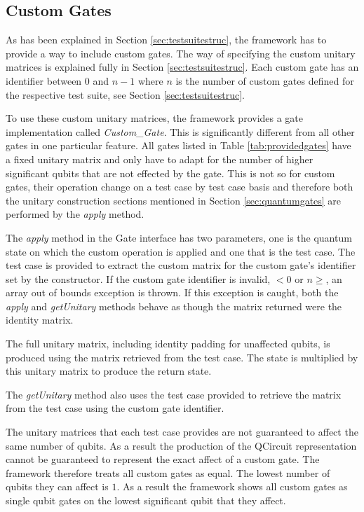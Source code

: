 \subsection{Custom Gates}
\label{sec:custgates}

As has been explained in Section \ref{sec:testsuitestruc}, the framework has to provide a way to include custom gates.
The way of specifying the custom unitary matrices is explained fully in Section \ref{sec:testsuitestruc}.
Each custom gate has an identifier between $0$ and $n-1$ where $n$ is the number of custom gates defined for the respective test suite, see Section \ref{sec:testsuitestruc}.

To use these custom unitary matrices, the framework provides a gate implementation called \emph{Custom\_Gate}.
This is significantly different from all other gates in one particular feature.
All gates listed in Table \ref{tab:providedgates} have a fixed unitary matrix and only have to adapt for the number of higher significant qubits that are not effected by the gate.
This is not so for custom gates, their operation change on a test case by test case basis and therefore both the unitary construction sections mentioned in Section \ref{sec:quantumgates} are performed by the \emph{apply} method.

The \emph{apply} method in the Gate interface has two parameters, one is the quantum state on which the custom operation is applied and one that is the test case.
The test case is provided to extract the custom matrix for the custom gate's identifier set by the constructor.
If the custom gate identifier is invalid, $<0$ or $n\geq$, an array out of bounds exception is thrown.
If this exception is caught, both the \emph{apply} and \emph{getUnitary} methods behave as though the matrix returned were the identity matrix.

The full unitary matrix, including identity padding for unaffected qubits, is produced using the matrix retrieved from the test case.
The state is multiplied by this unitary matrix to produce the return state.

The \emph{getUnitary} method also uses the test case provided to retrieve the matrix from the test case using the custom gate identifier.

The unitary matrices that each test case provides are not guaranteed to affect the same number of qubits.
As a result the production of the QCircuit\cite{QCsite} representation cannot be guaranteed to represent the exact affect of a custom gate.
The framework therefore treats all custom gates as equal.
The lowest number of qubits they can affect is $1$.
As a result the framework shows all custom gates as single qubit gates on the lowest significant qubit that they affect.

